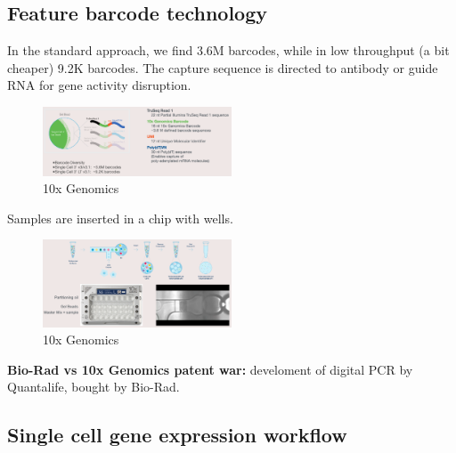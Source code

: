\hypertarget{feature-barcode-technology}{%
\subsection{Feature barcode
technology}\label{feature-barcode-technology}}

In the standard approach, we find 3.6M barcodes, while in low throughput
(a bit cheaper) 9.2K barcodes. The capture sequence is directed to
antibody or guide RNA for gene activity disruption.

\begin{figure}
\centering
\includegraphics[width=0.5\textwidth]{images/Screenshot_4.png}
\caption{10x Genomics}
\end{figure}

Samples are inserted in a chip with wells.

\begin{figure}
\centering
\includegraphics[width=0.5\textwidth]{images/Screenshot_5.png}
\caption{10x Genomics}
\end{figure}

\textbf{Bio-Rad vs 10x Genomics patent war:} develoment of digital PCR
by Quantalife, bought by Bio-Rad.

\hypertarget{single-cell-gene-expression-workflow}{%
\subsection{Single cell gene expression
workflow}\label{single-cell-gene-expression-workflow}}

